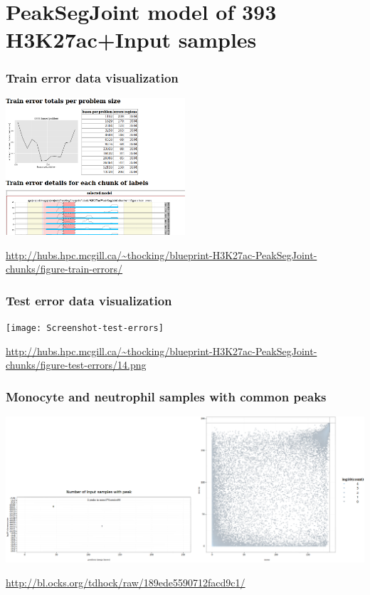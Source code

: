 \documentclass{beamer}
\begin{document}
\section{PeakSegJoint model of 393 H3K27ac+Input samples}

\begin{frame}
  \frametitle{Train error data visualization}
  \includegraphics[width=0.5\textwidth]{screenshot-train-errors}

  \url{http://hubs.hpc.mcgill.ca/~thocking/blueprint-H3K27ac-PeakSegJoint-chunks/figure-train-errors/}

\end{frame}

\begin{frame}
  \frametitle{Test error data visualization}
  \texttt{[image: Screenshot-test-errors]}

  \url{http://hubs.hpc.mcgill.ca/~thocking/blueprint-H3K27ac-PeakSegJoint-chunks/figure-test-errors/14.png}

\end{frame}

\begin{frame}
  \frametitle{Monocyte and neutrophil samples with common peaks}

  \includegraphics[width=\textwidth]{screenshot-H3K27ac-viz-results}

  \url{http://bl.ocks.org/tdhock/raw/189ede5590712facd9c1/}

\end{frame}
\end{document}
